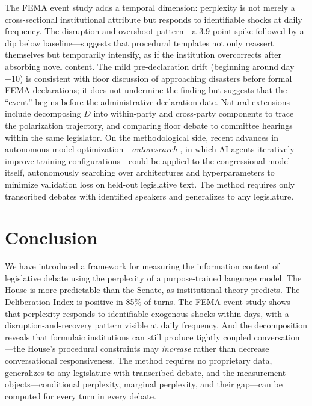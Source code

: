 \documentclass[12pt]{article}
\newcommand{\DI}{\mathit{D}}
\begin{document}
The FEMA event study adds a temporal dimension: perplexity is not merely a cross-sectional institutional attribute but responds to identifiable shocks at daily frequency. The disruption-and-overshoot pattern---a 3.9-point spike followed by a dip below baseline---suggests that procedural templates not only reassert themselves but temporarily intensify, as if the institution overcorrects after absorbing novel content. The mild pre-declaration drift (beginning around day $-10$) is consistent with floor discussion of approaching disasters before formal FEMA declarations; it does not undermine the finding but suggests that the ``event'' begins before the administrative declaration date. Natural extensions include decomposing $\DI$ into within-party and cross-party components to trace the polarization trajectory, and comparing floor debate to committee hearings within the same legislator. On the methodological side, recent advances in autonomous model optimization---\textit{autoresearch} \citep{karpathy2026auto}, in which AI agents iteratively improve training configurations---could be applied to the congressional model itself, autonomously searching over architectures and hyperparameters to minimize validation loss on held-out legislative text. The method requires only transcribed debates with identified speakers and generalizes to any legislature.


\section{Conclusion}

We have introduced a framework for measuring the information content of legislative debate using the perplexity of a purpose-trained language model. The House is more predictable than the Senate, as institutional theory predicts. The Deliberation Index is positive in 85\% of turns. The FEMA event study shows that perplexity responds to identifiable exogenous shocks within days, with a disruption-and-recovery pattern visible at daily frequency. And the decomposition reveals that formulaic institutions can still produce tightly coupled conversation---the House's procedural constraints may \textit{increase} rather than decrease conversational responsiveness. The method requires no proprietary data, generalizes to any legislature with transcribed debate, and the measurement objects---conditional perplexity, marginal perplexity, and their gap---can be computed for every turn in every debate.
\end{document}
